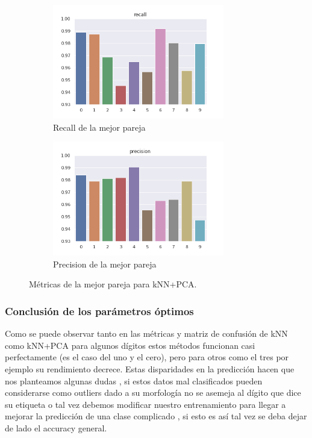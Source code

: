 \begin{figure}[h]
\begin{subfigure}{0.5\textwidth}
\includegraphics[width=0.9\linewidth, height=5cm]{images/recall_knnpca.png} 
\caption{Recall de la mejor pareja}
\label{fig:metpca1}
\end{subfigure}
\begin{subfigure}{0.5\textwidth}
\includegraphics[width=0.9\linewidth, height=5cm]{images/precision_knnpca.png} 
\caption{Precision de la mejor pareja}
\label{fig:metpca2}
\end{subfigure}
\caption{Métricas de la mejor pareja para kNN+PCA.}
\label{knnpca_metricas}%
\end{figure}


\subsubsection{Conclusión de los parámetros óptimos}


Como se puede observar tanto en las métricas y matriz de confusión de kNN como kNN+PCA para algunos dígitos estos métodos funcionan casi perfectamente (es el caso del uno y el cero), pero para otros como el tres por ejemplo su rendimiento decrece. Estas disparidades en la predicción hacen que nos planteamos algunas dudas , si estos datos mal clasificados pueden considerarse como outliers dado a su morfología no se asemeja al dígito que dice su etiqueta o tal vez debemos modificar nuestro entrenamiento para llegar a mejorar la predicción de una clase complicado , si esto es así tal vez se deba dejar de lado el accuracy general.

